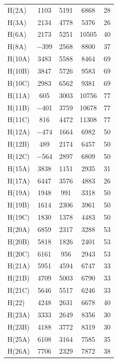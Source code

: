 \begin{center}
\tablelasttail{\bottomrule}
 {\footnotesize \singlespacing
\begin{supertabular}{lcccc}
H(2A)&1103&5191&6868&28\\
H(3A)&2134&4778&5376&26\\
H(6A)&2173&5251&10505&40\\
H(8A)&$-$399&2568&8800&37\\
H(10A)&3483&5588&8464&69\\
H(10B)&3847&5726&9583&69\\
H(10C)&2983&6562&9381&69\\
H(11A)&605&3003&10756&77\\
H(11B)&$-$401&3759&10678&77\\
H(11C)&816&4472&11308&77\\
H(12A)&$-$474&1664&6982&50\\
H(12B)&489&2174&6457&50\\
H(12C)&$-$564&2897&6809&50\\
H(15A)&3838&1151&2935&31\\
H(17A)&6447&3576&4883&26\\
H(19A)&1948&991&3318&50\\
H(19B)&1614&2306&3961&50\\
H(19C)&1830&1378&4483&50\\
H(20A)&6859&2317&3288&53\\
H(20B)&5818&1826&2401&53\\
H(20C)&6161&956&2943&53\\
H(21A)&5951&4594&6747&33\\
H(21B)&4709&5003&6790&33\\
H(21C)&5646&5517&6246&33\\
H(22)&4248&2631&6678&40\\
H(23A)&3333&2649&8356&30\\
H(23B)&4188&3772&8319&30\\
H(25A)&6108&3164&7585&35\\
H(26A)&7706&2329&7872&38\\

\end{supertabular}}
\end{center}
